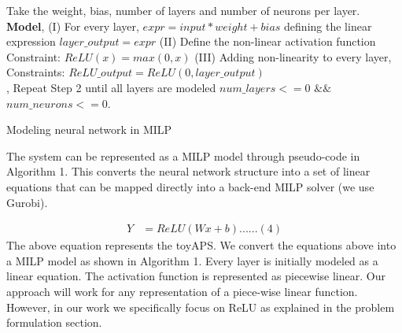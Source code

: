 \begin{algorithm}
	Take the weight, bias, number of layers and number of neurons per layer. \\
	
	\textbf{Model}, \linebreak
	(I) For every  layer,  $expr = input * weight + bias$
	\linebreak 
	defining the linear expression
	\linebreak
	$layer\_output = expr$
	\linebreak
	(II) Define the non-linear activation function 
	\linebreak 
	\qquad Constraint: $ReLU(x) = max (0,x)$
	\linebreak
	(III) Adding non-linearity to every layer,
	\linebreak
	Constraints: $ReLU\_output = ReLU(0, layer\_output)$\\, 
	Repeat Step 2 until all layers are modeled 
	\linebreak
	$num\_layers < = 0$   $ \&\& $ 
	$ num\_neurons < = 0 $.
	
	\caption{Modeling neural network in MILP}
	\label{algo:b}
\end{algorithm}


The system can be represented as a MILP model through pseudo-code in Algorithm 1. This converts the neural network structure into a set of linear equations that can be mapped directly into a back-end MILP solver (we use Gurobi). %

\begin{align*}
Y &=  ReLU(Wx + b) ...... (4)
\end{align*}
The above equation represents the toyAPS. We convert the equations above into a MILP model as shown in Algorithm 1. Every layer is initially modeled as a linear equation. The activation function is represented as piecewise linear. Our approach will work for any representation of a piece-wise linear function. However, in our work we specifically focus on ReLU as explained in the problem formulation section. 
